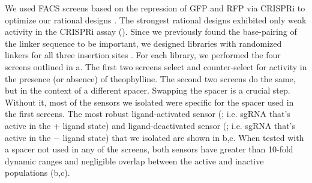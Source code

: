 \documentclass[10pt,oneside]{article}
\begin{document}
We used FACS screens based on the repression of GFP and RFP via CRISPRi to optimize our rational designs \invivo{}. The strongest rational designs exhibited only weak activity in the CRISPRi assay (). Since we previously found the base-pairing of the linker sequence to be important, we designed libraries with randomized linkers for all three insertion sites .  For each library, we performed the four screens outlined in a. The first two screens select and counter-select for activity in the presence (or absence) of theophylline. The second two screens do the same, but in the context of a different spacer. Swapping the spacer is a crucial step.  Without it, most of the sensors we isolated were specific for the spacer used in the first screens.  The most robust ligand-activated sensor (\ligrnaF{}; i.e. sgRNA that's active in the + ligand state) and ligand-deactivated sensor (\ligrnaB{}; i.e. sgRNA that's active in the − ligand state) that we isolated are shown in b,c.  When tested with a spacer not used in any of the screens, both sensors have greater than 10-fold dynamic ranges and negligible overlap between the active and inactive populations (b,c).


% 
% 
% 
%
\end{document}
